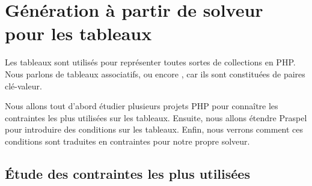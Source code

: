 \section{Génération à partir de solveur pour les tableaux}
\label{section:data:arrays}

Les tableaux sont utilisés pour représenter toutes sortes de collections en PHP.
Nous parlons de tableaux associatifs, ou encore , car ils
sont constituées de paires clé-valeur.

Nous allons tout d'abord étudier plusieurs projets PHP pour connaître les
contraintes les plus utilisées sur les tableaux. Ensuite, nous allons étendre
Praspel pour introduire des conditions sur les tableaux. Enfin, nous verrons
comment ces conditions sont traduites en contraintes pour notre propre solveur.

\subsection{Étude des contraintes les plus utilisées}

